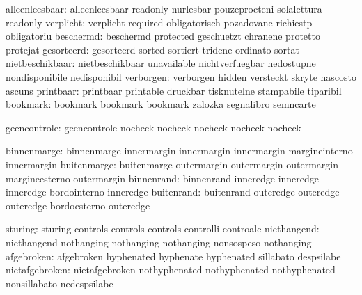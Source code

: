            alleenleesbaar: alleenleesbaar            readonly
                           nurlesbar                 pouzeprocteni
                           solalettura               readonly
                verplicht: verplicht                 required
                           obligatorisch             pozadovane
                           richiestp                 obligatoriu
                beschermd: beschermd                 protected
                           geschuetzt                chranene
                           protetto                  protejat
               gesorteerd: gesorteerd                sorted
                           sortiert                  tridene
                           ordinato                  sortat
          nietbeschikbaar: nietbeschikbaar           unavailable
                           nichtverfuegbar           nedostupne
                           nondisponibile            nedisponibil
                verborgen: verborgen                 hidden
                           versteckt                 skryte
                           nascosto                  ascuns
                printbaar: printbaar                 printable
                           druckbar                  tisknutelne
                           stampabile                tiparibil
                 bookmark: bookmark                  bookmark
                           bookmark                  zalozka
                           segnalibro                semncarte

geencontrole: geencontrole  nocheck
              nocheck       nocheck 
              nocheck       nocheck 


              binnenmarge: binnenmarge               innermargin
                           innermargin               innermargin
                           margineinterno            innermargin
              buitenmarge: buitenmarge               outermargin
                           outermargin               outermargin
                           margineesterno            outermargin
               binnenrand: binnenrand                inneredge
                           inneredge                 inneredge
                           bordointerno              inneredge
               buitenrand: buitenrand                outeredge
                           outeredge                 outeredge
                           bordoesterno              outeredge

                  sturing: sturing                   controls
                           controls                  controls
                           controlli                 controale
              niethangend: niethangend               nothanging
                           nothanging                nothanging
                           nonsospeso                nothanging
               afgebroken: afgebroken                hyphenated
                           hyphenate                 hyphenated
                           sillabato                 despsilabe
           nietafgebroken: nietafgebroken            nothyphenated
                           nothyphenated             nothyphenated
                           nonsillabato              nedespsilabe

